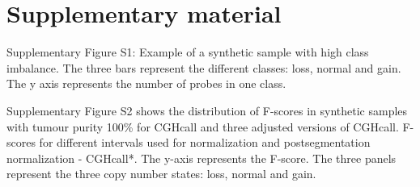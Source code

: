 \documentclass[a4paper,10pt]{article}
\begin{document}
\section{Supplementary material}

Supplementary Figure S1: Example of a synthetic sample with high class imbalance. The three bars represent the different classes: loss, normal and gain. The y axis represents the number of probes in one class.


\noindent Supplementary Figure S2 shows the distribution of F-scores in synthetic samples with tumour purity 100\% for CGHcall and three adjusted versions of CGHcall. F-scores for different intervals used for normalization and postsegmentation normalization - CGHcall*. The y-axis represents the F-score. The three panels represent the three copy number states: loss, normal and gain.
\end{document}
